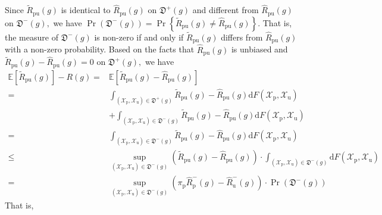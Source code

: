 \documentclass[12pt]{article}
\theoremstyle{definition}
\begin{document}
 Since $\widetilde{R}_{\mathrm{pu}}(g)$ is identical to $\widehat{R}_{\mathrm{pu}}(g)$ on $\mathfrak{D}^{+}(g)$ and different from $\widehat{R}_{\mathrm{pu}}(g)$ on $\mathfrak{D}^{-}(g),$ we have $\operatorname{Pr}\left(\mathfrak{D}^{-}(g)\right)=\operatorname{Pr}\left\{\widetilde{R}_{\mathrm{pu}}(g) \neq \widehat{R}_{\mathrm{pu}}(g)\right\} .$ That is, the measure of $\mathfrak{D}^{-}(g)$
 is non-zero if and only if $\widetilde{R}_{\mathrm{pu}}(g)$ differs from $\widehat{R}_{\mathrm{pu}}(g)$ with a non-zero probability.
 Based on the facts that $\widehat{R}_{\mathrm{pu}}(g)$ is unbiased and $\widetilde{R}_{\mathrm{pu}}(g)-\widehat{R}_{\mathrm{pu}}(g)=0$ on $\mathfrak{D}^{+}(g),$ we have
 \[
 \begin{aligned}
 \mathbb{E}\left[\widetilde{R}_{\mathrm{pu}}(g)\right]-R(g)=& \mathbb{E}\left[\widetilde{R}_{\mathrm{pu}}(g)-\widehat{R}_{\mathrm{pu}}(g)\right] \\
 =& \int_{\left(\mathcal{X}_{\mathrm{p}}, \mathcal{X}_{\mathrm{u}}\right) \in \mathfrak{D}^{+}(g)} \widetilde{R}_{\mathrm{pu}}(g)-\widehat{R}_{\mathrm{pu}}(g) \mathrm{d} F\left(\mathcal{X}_{\mathrm{p}}, \mathcal{X}_{\mathrm{u}}\right) \\
 &+\int_{\left(\mathcal{X}_{\mathrm{p}}, \mathcal{X}_{\mathrm{u}}\right) \in \mathfrak{D}^{-}(g)} \widetilde{R}_{\mathrm{pu}}(g)-\widehat{R}_{\mathrm{pu}}(g) \mathrm{d} F\left(\mathcal{X}_{\mathrm{p}}, \mathcal{X}_{\mathrm{u}}\right) \\
 =& \int_{\left(\mathcal{X}_{\mathrm{p}}, \mathcal{X}_{\mathrm{u}}\right) \in \mathfrak{D}^{-}(g)} \widetilde{R}_{\mathrm{pu}}(g)-\widehat{R}_{\mathrm{pu}}(g) \mathrm{d} F\left(\mathcal{X}_{\mathrm{p}}, \mathcal{X}_{\mathrm{u}}\right)\\
  \leq &\sup _{\left(\mathcal{X}_{\mathrm{p}}, \mathcal{X}_{\mathrm{u}}\right) \in \mathfrak{D}^{-}(g)}\left(\widetilde{R}_{\mathrm{pu}}(g)-\widehat{R}_{\mathrm{pu}}(g)\right) \cdot \int_{\left(\mathcal{X}_{\mathrm{p}}, \mathcal{X}_{\mathrm{u}}\right) \in \mathfrak{D}^{-}(g)} \mathrm{d} F\left(\mathcal{X}_{\mathrm{p}}, \mathcal{X}_{\mathrm{u}}\right) \\
= &\sup _{\left(\mathcal{X}_{\mathrm{p}}, \mathcal{X}_{\mathrm{u}}\right) \in \mathfrak{D}^{-}(g)}\left(\pi_{\mathrm{p}} \widehat{R}_{\mathrm{p}}^{-}(g)-\widehat{R}_{\mathrm{u}}^{-}(g)\right) \cdot \operatorname{Pr}\left(\mathfrak{D}^{-}(g)\right) 
 \end{aligned}
 \]
 That is, 
\end{document}
